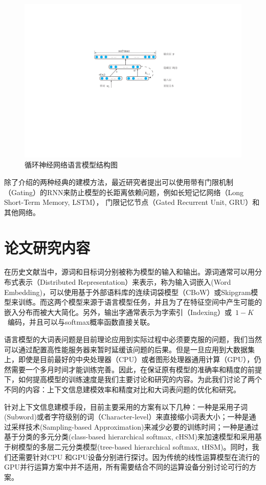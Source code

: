 \begin{figure}
  \centering
  \includegraphics[width=.8\linewidth]{./figures/rnnlm.pdf}
  \caption{循环神经网络语言模型结构图}\label{fig:rnnlm}
\end{figure}


除了介绍的两种经典的建模方法，最近研究者提出可以使用带有门限机制（Gating）的RNN来防止模型的长距离依赖问题，例如长短记忆网络（Long Short-Term Memory, LSTM）， 门限记忆节点（Gated Recurrent Unit, GRU）和其他网络。


\section{论文研究内容}
在历史文献当中，源词和目标词分别被称为模型的输入和输出。源词通常可以用分布式表示（Distributed Representation）来表示，称为输入词嵌入(Word Embedding)，可以使用基于外部语料库的连续词袋模型（CBoW）或Skipgram模型来训练。而这两个模型来源于语言模型任务，并且为了在特征空间中产生可能的嵌入分布而被大大简化。另外，输出字通常表示为字索引（Indexing）或~$1-K$~编码，并且可以与softmax概率函数直接关联。

语言模型的大词表问题是目前理论应用到实际过程中必须要克服的问题，我们当然可以通过配置高性能服务器来暂时延缓该问题的后果。但是一旦应用到大数据集上，即使是目前最好的中央处理器（CPU）或者图形处理器通用计算（GPU），仍然需要一个多月时间才能训练完善。因此，在保证原有模型的准确率和精度的前提下，如何提高模型的训练速度是我们主要讨论和研究的内容。为此我们讨论了两个不同的内容：上下文信息建模效率和精度对比和大词表问题的优化和研究。

针对上下文信息建模手段，目前主要采用的方案有以下几种：一种是采用子词(Subword)或者字符级别的词（Character-level）来直接缩小词表大小；一种是通过采样技术(Sampling-based Approximation)来减少必要的训练时间；一种是通过基于分类的多元分类(class-based hierarchical softmax, cHSM)来加速模型和采用基于树模型的多层二元分类模型(tree-based hierarchical softmax, tHSM)。同时，我们还需要针对CPU 和GPU设备分别进行探讨。因为传统的线性运算模型在流行的GPU并行运算方案中并不适用，所有需要结合不同的运算设备分别讨论可行的方案。

